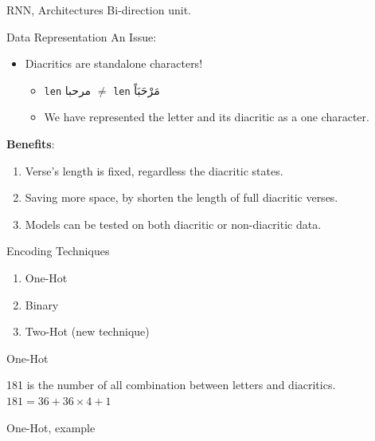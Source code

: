 \documentclass[10pt]{beamer}
\begin{document}
\begin{frame}[fragile]{RNN, Architectures}
Bi-direction unit.
\end{frame}

\begin{frame}[fragile]{Data Representation}
An Issue:
\begin{itemize}
    \item Diacritics are standalone characters!
    \begin{itemize}
        \item \texttt{len} \textarabic{مرحبا} $\neq$ \texttt{len} \textarabic{مَرْحَبَاً}
        \item We have represented the letter and its diacritic as a \alert{one
character}.
    \end{itemize}
\end{itemize}
\textbf{Benefits}:
\begin{enumerate}
    \item Verse's length is fixed, regardless the diacritic states.
    \item Saving more space, by shorten the length of full diacritic verses. 
    \item Models can be tested on both diacritic or non-diacritic data.
\end{enumerate}
\end{frame}

\begin{frame}[fragile]{Encoding Techniques}
\begin{enumerate}
    \item One-Hot
    \item Binary
    \item \alert{Two-Hot} (new technique)

\end{enumerate}
\end{frame}

\begin{frame}[fragile]{One-Hot}
    \begin{center}
        
    \end{center}
181 is the number of all combination between letters and diacritics.\\
$181 = 36 + 36 \times 4 + 1$
\end{frame}

\begin{frame}[fragile]{One-Hot, example}
    \begin{center}
        
    \end{center}
\end{frame}
\end{document}
